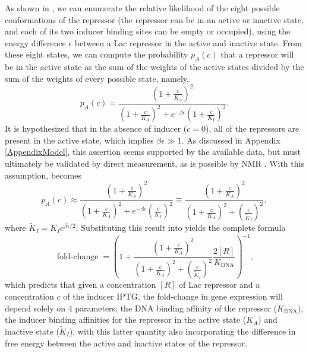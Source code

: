 \documentclass[10pt,letterpaper]{article}
\newcommand{\K}{K_{\text{DNA}}}
\newcommand \foldchange{\operatorname{fold-change}}
\begin{document}
As shown in \fref[figrepressorInducerStates], we can enumerate the relative
likelihood of the eight possible conformations of the repressor (the repressor
can be in an active or inactive state, and each of its two inducer binding sites
can be empty or occupied), using the energy difference $\epsilon$ between a Lac
repressor in the active and inactive state. From these eight states, we can
compute the probability \(p_A(c)\) that a repressor will be in the active state
as the sum of the weights of the active states divided by the sum of the weights
of every possible state, namely,
\begin{equation}\label{eq6}
p_A(c)=\frac{\left(1+\frac{c}{K_A}\right)^2}{\left(1+\frac{c}{K_A}\right)^2+e^{-\beta  \epsilon }\left(1+\frac{c}{K_I}\right)^2}.
\end{equation}
It is hypothesized that in the absence of inducer ($c=0$), all of the repressors
are present in the active state, which implies $\beta \epsilon \gg 1$. As
discussed in Appendix \ref{AppendixModel}, this assertion seems supported by the
available data, but must ultimately be validated by direct measurement, as is
possible by NMR \cite{Gardino2003, Boulton2016}. With this assumption,
\eref[eq6] becomes
\begin{equation}\label{eq6v2}
p_A(c) \approx \frac{\left(1+\frac{c}{K_A}\right)^2}{\left(1+\frac{c}{K_A}\right)^2+e^{-\beta  \epsilon }\left(\frac{c}{K_I}\right)^2} \equiv \frac{\left(1+\frac{c}{K_A}\right)^2}{\left(1+\frac{c}{K_A}\right)^2+\left(\frac{c}{\tilde{K}_I}\right)^2},
\end{equation}
where $\tilde{K}_I = K_I e^{\beta  \epsilon/2}$. Substituting this result into \eref[eq5] yields the complete formula
\begin{equation}\label{eq7}
\foldchange= \left(
1+\frac{\left(1+\frac{c}{K_A}\right)^2}{\left(1+\frac{c}{K_A}\right)^2+\left(\frac{c}{\tilde{K}_I}\right)^2}\frac{2[R]}{\K} \right)^{-1},
\end{equation}
which predicts that given a concentration \([R]\) of Lac repressor and a
concentration \(c\) of the inducer IPTG, the fold-change in gene expression will
depend solely on 4 parameters: the DNA binding affinity of the repressor
(\(\K\)), the inducer binding affinities for the repressor in the active state
(\(K_A\)) and inactive state (\(\tilde{K}_I\)), with this latter quantity also
incorporating the difference in free energy between the active and inactive
states of the repressor.

\end{document}
